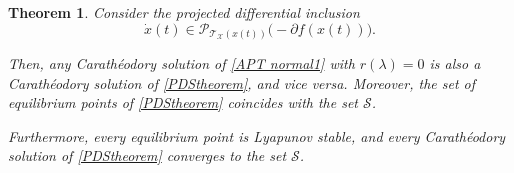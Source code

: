 \documentclass[9pt,journal,twoside,web]{ieeecolor}
\newtheorem{theorem}{Theorem}
\begin{document}
\begin{theorem}
Consider the projected differential inclusion
\begin{equation}
    \Dot{x}(t)
    \in
    \mathcal{P}_{\mathcal{T}_{\mathcal{X}}(x(t))}
    \bigl(-\partial f(x(t))\bigr).
    \label{PDStheorem}
\end{equation}

Then, any Carath\'eodory solution of \eqref{APT normal1} with $r(\lambda)=0$ is also a Carath\'eodory solution of \eqref{PDStheorem}, and vice versa. Moreover, the set of equilibrium points of \eqref{PDStheorem} coincides with the set $\mathcal{S}$.

Furthermore, every equilibrium point is Lyapunov stable, and every Carath\'eodory solution of \eqref{PDStheorem} converges to the set $\mathcal{S}$.
\label{stability1}
\end{theorem}
\end{document}

